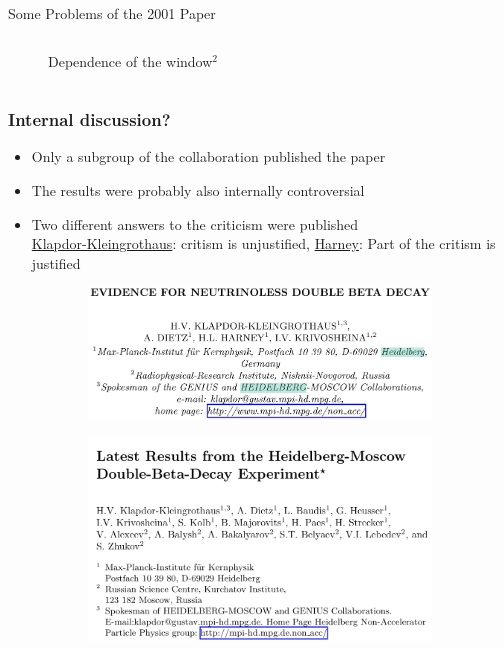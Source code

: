 \begin{frame}{Some Problems of the 2001 Paper}
\begin{columns}
\begin{column}{.5\textwidth}
\begin{figure}
				\caption*{Dependence of the window${}^2$}
			\end{figure}
		\end{column}
	\end{columns}
	\vspace{-1em}
\end{frame}
\begin{frame}
	\frametitle{Internal discussion?}
	\begin{itemize}
		\centering
		\item Only a subgroup of the collaboration published the paper
		\item The results were probably also internally controversial
		\item Two different answers to the criticism were published\\ 
			\href{https://arxiv.org/abs/hep-ph/0205228}{Klapdor-Kleingrothaus}: critism is unjustified, \href{https://arxiv.org/abs/hep-ph/0205293}{Harney}: Part of the critism is justified
	\end{itemize}
	\vspace{-2em}
	\begin{figure}
		\centering
		\begin{subfigure}[t]{.5\textwidth}
			\begin{center}
				\includegraphics[width=\textwidth]{media/evidence_pic.png}
			\end{center}
		\end{subfigure}
		\begin{subfigure}[t]{.49\textwidth}
			\begin{center}
				\includegraphics[width=\textwidth]{media/earlier_pic.png}
			\end{center}
		\end{subfigure}
	\end{figure}
\end{frame}
